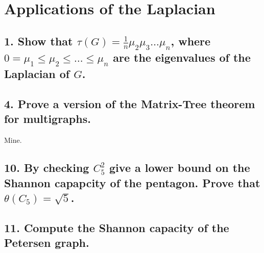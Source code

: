 \section{Applications of the Laplacian}

\subsection[Applications - 1]{1. Show that $\tau(G) = \frac{1}{n} \mu_2 \mu_3 \dots \mu_n$, where $0 = \mu_1 \leq \mu_2 \leq \dots \leq \mu_n$ are the eigenvalues of the Laplacian of $G$.}

\subsection[Applications - 4]{4. Prove a version of the Matrix-Tree theorem for multigraphs.}

Mine.

\subsection[Applications - 10]{10. By checking $C_5^2$ give a lower bound on the Shannon capapcity of the pentagon. Prove that $\theta(C_5) = \sqrt{5}$.}

\subsection[Applications - 11]{11. Compute the Shannon capacity of the Petersen graph.}
